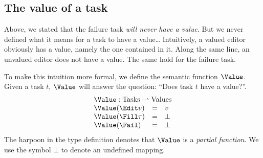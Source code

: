 \subsection{The value of a task}

Above, we stated that the failure task \emph{will never have a value}.
But we never defined what it means for a task to have a value\ldots
Intuitively,
a valued editor obviously has a value,
namely the one contained in it.
Along the same line,
an unvalued editor does not have a value.
The same hold for the failure task.

To make this intuition more formal,
we define the semantic function $\Value$.
Given a task $t$, $\Value$ will answer the question:
\enquote{Does task $t$ have a value?}.
\begin{equation*}
  \begin{array}{lcl}
    \multicolumn{3}{l}{\Value : \mathrm{Tasks} \rightharpoonup \mathrm{Values}} \\
    \Value(\Edit v)    &=& v \\
    \Value(\Fill \tau) &=& \bot \\
    \Value(\Fail)      &=& \bot
  \end{array}
\end{equation*}
The harpoon in the type definition denotes that $\Value$ is a \emph{partial function}.
We use the symbol $\bot$ to denote an undefined mapping.
